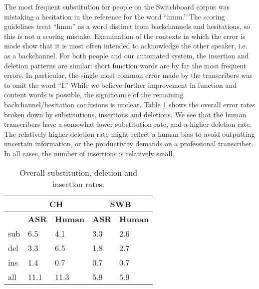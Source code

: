\documentclass{article}
\begin{document}
The most frequent
substitution 
for people on the Switchboard corpus was mistaking  a hesitation in the
reference for the word ``hmm.'' 
The scoring guidelines treat ``hmm''
as a word distinct from backchannels and hesitations, so this is not
a scoring mistake. Examination of the contexts in which the error is made 
show that it is most often intended to acknowledge the other speaker,
i.e. as a backchannel. For both people and our automated system, the
insertion and deletion patterns are similar: short function words are
by far the most frequent errors. 
In particular, the single most common error made by the transcribers
was to omit the word ``I.''
While we believe further improvement in 
function and content words is possible, the significance of the
remaining backchannel/hesitation confusions is unclear.
Table \ref{tab:dtl} shows the overall error rates broken down by 
substitutions, insertions and deletions. We see that the human transcribers
have a somewhat lower substitution rate, and a higher deletion rate. The
relatively higher deletion rate might reflect a human bias to avoid 
outputting uncertain information, or the productivity demands on a 
professional transcriber. In all cases, the number of insertions is 
relatively small.
 
\begin{table}[t]
    \centering
\caption{Overall substitution, deletion and insertion rates.}
\vspace*{0.1in}
\label{tab:dtl}
        \small
    \begin{tabular}{|l|l|l||l|l|}
    \hline
    & \multicolumn{2}{|c||}{{\bf CH}} & \multicolumn{2}{c|}{{\bf SWB}} \\ \hline 
            &         {\bf ASR}   & {\bf Human}   & {\bf ASR}   & {\bf Human}  \\ \hline \hline
sub & 6.5 & 4.1 & 3.3 &  2.6     \\ \hline
del & 3.3 & 6.5 & 1.8 &  2.7     \\ \hline
ins & 1.4 & 0.7 & 0.7 &  0.7     \\ \hline
all & 11.1 & 11.3 & 5.9 & 5.9    \\ \hline
        \end{tabular}
\end{table}
\end{document}
